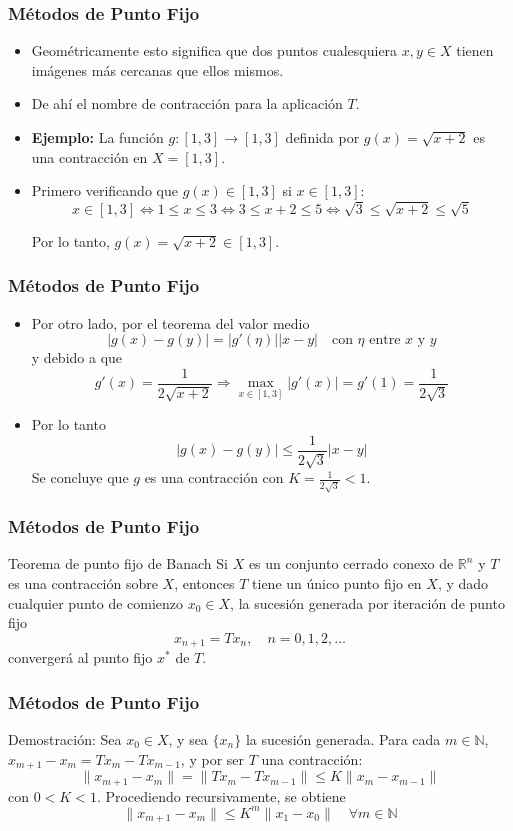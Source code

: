 \documentclass{beamer}
\begin{document}
\begin{frame}
  \frametitle{M\'etodos de Punto Fijo}
  \begin{itemize}
    \item<1-> Geom\'etricamente esto significa que dos puntos cualesquiera $x, y \in X$ tienen im\'agenes m\'as cercanas que ellos
    mismos.
    \item<2-> De ah\'i el nombre de contracci\'on para la aplicaci\'on $T$.    
    \item<3-> \textbf{Ejemplo:} La funci\'on $g: [1, 3] \to [1, 3]$ definida por $g(x) = \sqrt{x + 2}$ es una contracci\'on
    en $X = [1, 3]$.
    \item<4->Primero verificando que $g(x) \in [1, 3]$ si $x \in [1, 3]$:
    $$
    x \in [1,3] \Leftrightarrow 1 \leq x \leq 3 \Leftrightarrow 3 \leq x+2 \leq 5  \Leftrightarrow \sqrt{3} \leq
    \sqrt{x+2} \leq \sqrt{5}
    $$
    
    Por lo tanto, $g(x) = \sqrt{x + 2} \in [1, 3]$.
  \end{itemize}
\end{frame}
\begin{frame}
  \frametitle{M\'etodos de Punto Fijo}
  \begin{itemize}
    \item<1-> Por otro lado, por el teorema del valor medio
    $$
    |g(x)-g(y)|= |g'(\eta)||x-y| \quad\mbox{con $\eta$ entre $x$ y $y$}
    $$
    y debido a que
    $$
    g'(x) = \frac{1}{2\sqrt{x+2}}  \Rightarrow \max_{x\in[1,3]}|g'(x)|=g'(1)= \frac{1}{2\sqrt{3}}
    $$
    \item<2->Por lo tanto
    $$
    |g(x)-g(y)| \leq \frac{1}{2\sqrt{3}}|x-y|
    $$
    Se concluye que $g$ es una contracci\'on con $K = \frac{1}{2\sqrt{3}}<1$.
  \end{itemize}
\end{frame}
\begin{frame}
  \frametitle{M\'etodos de Punto Fijo}
  \begin{block}{Teorema de punto fijo de Banach}
    Si $X$ es un conjunto cerrado conexo de $\mathbb{R}^n$ y $T$ es una
contracci\'on sobre $X$, entonces $T$ tiene un \'unico punto fijo en $X$, y dado cualquier punto de comienzo $x_0 \in X$,
la sucesi\'on generada por iteraci\'on de punto fijo
$$
x_{n+1} = Tx_n, \quad n=0,1,2,\ldots
$$
converger\'a al punto fijo $x^*$ de $T$.
  \end{block}
\end{frame}
\begin{frame}
  \frametitle{M\'etodos de Punto Fijo}
  \begin{block}{Demostraci\'on:}
    Sea $x_0 \in X$, y sea $\{x_n\}$ la sucesi\'on generada. Para cada $m \in
    \mathbb{N}$, $x_{m+1} - x_m = T x_m - T x_{m-1}$, y por ser $T$ una contracci\'on:
    $$
    \|x_{m+1} - x_m\| = \|T x_m - T x_{m-1}\| \leq K\|x_m - x_{m-1}\|
    $$
    con $0 < K < 1$. Procediendo recursivamente, se obtiene
    $$
    \|x_{m+1} - x_m\| \leq K^m\|x_1 - x_0\| \quad \forall m \in \mathbb{N}  
    $$
  \end{block}
\end{frame}
\end{document}
